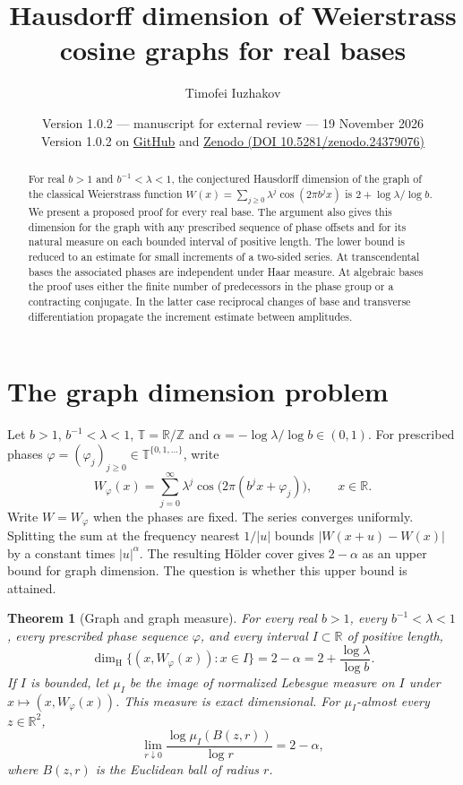 \documentclass[11pt,a4paper]{article}
\title{Hausdorff dimension of Weierstrass cosine graphs for real bases}
\author{Timofei Iuzhakov}
\date{\normalsize Version 1.0.2 --- manuscript for external review --- 19 November 2026\\[2pt]
  {\small Version 1.0.2 on
  \href{https://github.com/ppadfoot/weierstrass-real-bases/releases/tag/v1.0.2}{\underline{GitHub}}
  and \href{https://doi.org/10.5281/zenodo.24379076}{\underline{Zenodo (DOI 10.5281/zenodo.24379076)}}}}
\newtheorem{theorem}{Theorem}[section]
\newcommand{\T}{\mathbb T}
\begin{document}
\maketitle
\begin{abstract}
For real $b>1$ and $b^{-1}<\lambda<1$, the conjectured Hausdorff dimension
of the graph of the classical Weierstrass function
$W(x)=\sum_{j\ge0}\lambda^j\cos(2\pi b^j x)$ is
$2+\log\lambda/\log b$. We present a proposed proof for every real
base. The argument also gives this dimension for the graph with any
prescribed sequence of phase offsets and for its natural measure on
each bounded interval of positive length. The lower bound is reduced
to an estimate for small increments of a two-sided series. At
transcendental bases the associated phases are independent under Haar
measure. At algebraic bases the proof uses either the finite number of
predecessors in the phase group or a contracting conjugate. In the
latter case reciprocal changes of base and transverse differentiation
propagate the increment estimate between amplitudes.
\end{abstract}

\section{The graph dimension problem}\label{sec:intro}
Let $b>1$, $b^{-1}<\lambda<1$, $\T=\mathbb R/\mathbb Z$ and
$\alpha=-\log\lambda/\log b\in(0,1)$. For prescribed phases
$\varphi=(\varphi_j)_{j\ge0}\in\T^{\{0,1,\ldots\}}$, write
\[
 W_\varphi(x)=\sum_{j=0}^{\infty}\lambda^j
              \cos\bigl(2\pi(b^jx+\varphi_j)\bigr),\qquad x\in\mathbb R.
\]
Write $W=W_\varphi$ when the phases are fixed. The series converges
uniformly. Splitting the sum at the frequency nearest $1/|u|$ bounds
$|W(x+u)-W(x)|$ by a constant times $|u|^\alpha$. The resulting
H\"older cover gives $2-\alpha$ as an upper bound for graph dimension.
The question is whether this upper bound is attained.

\begin{theorem}[Graph and graph measure]\label{thm:main}
For every real $b>1$, every $b^{-1}<\lambda<1$, every prescribed
phase sequence $\varphi$, and every interval $I\subset\mathbb R$ of
positive length,
\[
 \dim_{\mathrm H}\{(x,W_\varphi(x)):x\in I\}=2-\alpha
                    =2+\frac{\log\lambda}{\log b}.
\]
If $I$ is bounded, let $\mu_I$ be the image of normalized Lebesgue
measure on $I$ under $x\mapsto(x,W_\varphi(x))$. This measure is
exact dimensional. For $\mu_I$-almost every $z\in\mathbb R^2$,
\[
 \lim_{r\downarrow0}\frac{\log\mu_I(B(z,r))}{\log r}=2-\alpha,
\]
where $B(z,r)$ is the Euclidean ball of radius $r$.
\end{theorem}
\end{document}

